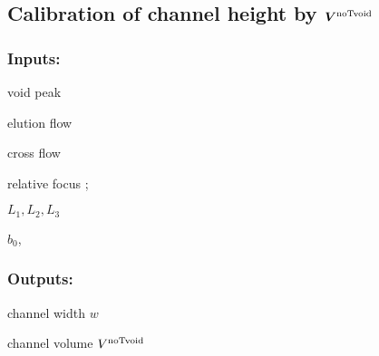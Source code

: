 \begin{comment}
  \State \Return \CFone
\end{algorithmic}
\clearpage
\end{comment}
\clearpage
\subsection*{Calibration of channel height by $\bm{V^\text{noTvoid}}$}
\subsubsection*{Inputs:}
\label{sec:CalibVhyd}
\begin{multicols}{3}
  \begin{packed_item}
    \item void peak \tvoid
    \item elution flow \Ve
    \item cross flow \Vc
    \item relative focus \zP;
    \item $L_1, L_2, L_3$
    \item $b_0$, \bL
  \end{packed_item}
\end{multicols}

\subsubsection*{Outputs:}
\begin{multicols}{3}
  \begin{packed_item}
    \item channel width $w$
    \item channel volume $V^\text{noTvoid}$
  \end{packed_item}
\end{multicols}

